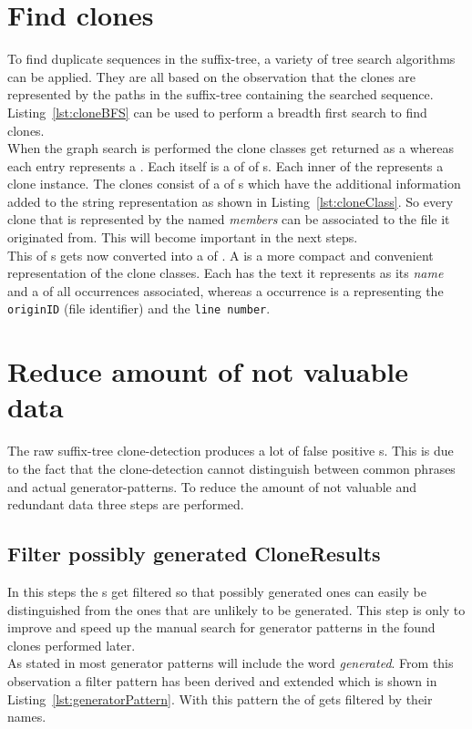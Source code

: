 \section{Find clones}
\label{section:findClones}
To find duplicate sequences in the suffix-tree, a variety of tree search algorithms can be applied. They are all based on the observation that the clones are represented by the paths in the suffix-tree containing the searched sequence. Listing~\ref{lst:cloneBFS} can be used to perform a breadth first search to find clones.\\
When the graph search is performed the clone classes get returned as a  whereas each entry represents a . Each  itself is a  of  of s. Each inner  of the  represents a clone instance. The clones consist of a  of s which have the additional information added to the string representation as shown in Listing~\ref{lst:cloneClass}. So every clone that is represented by the  named \textit{members} can be associated to the file it originated from. This will become important in the next steps.\\
This  of s gets now converted into a  of . A  is a more compact and convenient representation of the clone classes. Each has the text it represents as its \textit{name} and a  of all occurrences associated, whereas a occurrence is a  representing the \texttt{originID} (file identifier) and the \texttt{line number}. 




\section{Reduce amount of not valuable data}
\label{section:processCloneResults}
The raw suffix-tree clone-detection produces a lot of false positive s. This is due to the fact that the clone-detection cannot distinguish between common phrases and actual generator-patterns. To reduce the amount of not valuable and redundant data three steps are performed.
\subsection{Filter possibly generated CloneResults}
In this steps the s get filtered so that possibly generated ones can easily be distinguished from the ones that are unlikely to be generated. This step is only to improve and speed up the manual search for generator patterns in the found clones performed later.\\
As stated in \cite{Bernwieser2014} most generator patterns will include the word \textit{generated}. From this observation a filter pattern has been derived and extended which is shown in Listing~\ref{lst:generatorPattern}. With this pattern the  of  gets filtered by their names.


